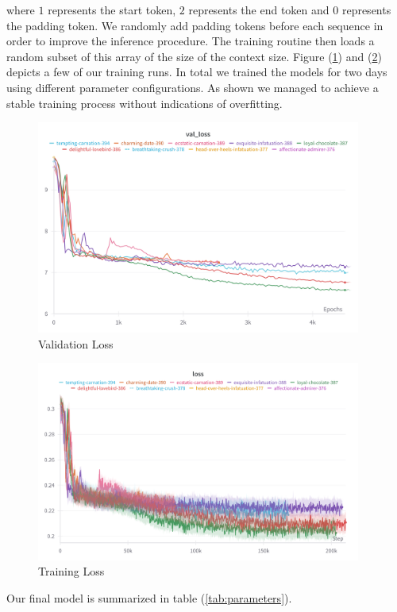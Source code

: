 \documentclass[a4paper,12pt]{extarticle}
\begin{document}
\vspace{0.15cm}
where $1$ represents the start token, $2$ represents the end token and $0$ represents the padding token.
We randomly add padding tokens before each sequence in order to improve the inference procedure.
The training routine then loads a random subset of this array of the size of the context size.
Figure (\ref{fig:val_loss}) and (\ref{fig:train_loss}) depicts a few of our training runs. In total we trained the models for two days using different parameter configurations. As shown we managed to achieve a stable training process without indications of overfitting.
\begin{figure}[H]
  \centering
  \includegraphics[width=0.95\textwidth]{val_loss.png}
  \caption{Validation Loss}
  \label{fig:val_loss}
\end{figure}

\begin{figure}[H]
  \centering
  \includegraphics[width=0.95\textwidth]{train_loss.png}
  \caption{Training Loss}
  \label{fig:train_loss}
\end{figure}
Our final model is summarized in table (\ref{tab:parameters}).
\end{document}
